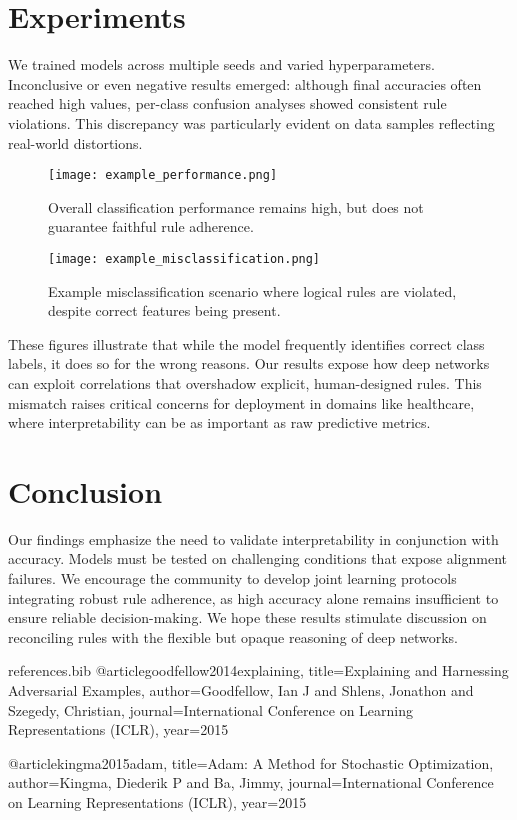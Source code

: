 \documentclass[11pt]{article}
\begin{document}
\section{Experiments}
We trained models across multiple seeds and varied hyperparameters. Inconclusive or even negative results emerged: although final accuracies often reached high values, per-class confusion analyses showed consistent rule violations. This discrepancy was particularly evident on data samples reflecting real-world distortions.

\begin{figure}[t]
\centering
\texttt{[image: example\_performance.png]}
\caption{Overall classification performance remains high, but does not guarantee faithful rule adherence.}
\label{fig:example}
\end{figure}

\begin{figure}[t]
\centering
\texttt{[image: example\_misclassification.png]}
\caption{Example misclassification scenario where logical rules are violated, despite correct features being present.}
\label{fig:misclass}
\end{figure}

These figures illustrate that while the model frequently identifies correct class labels, it does so for the wrong reasons. Our results expose how deep networks can exploit correlations that overshadow explicit, human-designed rules. This mismatch raises critical concerns for deployment in domains like healthcare, where interpretability can be as important as raw predictive metrics.

\section{Conclusion}
Our findings emphasize the need to validate interpretability in conjunction with accuracy. Models must be tested on challenging conditions that expose alignment failures. We encourage the community to develop joint learning protocols integrating robust rule adherence, as high accuracy alone remains insufficient to ensure reliable decision-making. We hope these results stimulate discussion on reconciling rules with the flexible but opaque reasoning of deep networks.




\begin{filecontents}{references.bib}
@article{goodfellow2014explaining,
  title={Explaining and Harnessing Adversarial Examples},
  author={Goodfellow, Ian J and Shlens, Jonathon and Szegedy, Christian},
  journal={International Conference on Learning Representations (ICLR)},
  year={2015}
}

@article{kingma2015adam,
  title={Adam: A Method for Stochastic Optimization},
  author={Kingma, Diederik P and Ba, Jimmy},
  journal={International Conference on Learning Representations (ICLR)},
  year={2015}
}
\end{filecontents}
\end{document}
